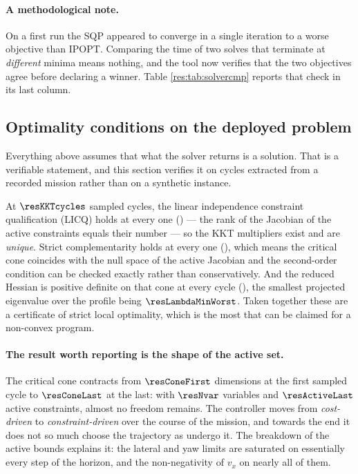 \documentclass[11pt,a4paper]{article}
\begin{document}
\paragraph{A methodological note.} On a first run the SQP appeared to converge in a single iteration to a
worse objective than IPOPT. Comparing the time of two solves that terminate at \emph{different} minima means
nothing, and the tool now verifies that the two objectives agree before declaring a winner. Table
\ref{res:tab:solvercmp} reports that check in its last column.

\subsection{Optimality conditions on the deployed problem}
\label{sec:kkt}

Everything above assumes that what the solver returns is a solution. That is a verifiable statement, and this
section verifies it on cycles extracted from a recorded mission rather than on a synthetic instance.

\begin{table}[htbp]
  \centering
  \small
  \caption{%
  Optimality diagnostics at sampled cycles of the recorded run \resBag. ``active'' counts equalities and
  active bounds together; ``rank'' is the rank of the Jacobian of the active constraints, so LICQ holds
  when the two coincide.}
  \label{res:tab:kkt}
\end{table}

At $\resKKTcycles$ sampled cycles, the linear independence constraint qualification (LICQ) holds at every one (\resLICQalways) --- the rank of the Jacobian of
the active constraints equals their number --- so the KKT multipliers exist and are \emph{unique}. Strict
complementarity holds at every one (\resStrictAlways), which means the critical cone coincides with the null
space of the active Jacobian and the second-order condition can be checked exactly rather than
conservatively. And the reduced Hessian is positive definite on that cone at every cycle
(\resSOCalways), the smallest projected eigenvalue over the profile being $\resLambdaMinWorst$. Taken
together these are a certificate of strict local optimality, which is the most that can be claimed for a
non-convex program.

\paragraph{The result worth reporting is the shape of the active set.} The critical cone contracts from
$\resConeFirst$ dimensions at the first sampled cycle to $\resConeLast$ at the last: with $\resNvar$
variables and $\resActiveLast$ active constraints, almost no freedom remains. The controller moves from
\emph{cost-driven} to \emph{constraint-driven} over the course of the mission, and towards the end it does
not so much choose the trajectory as undergo it. The breakdown of the active bounds explains it: the lateral
and yaw limits are saturated on essentially every step of the horizon, and the non-negativity of $v_x$ on
nearly all of them.
\end{document}
